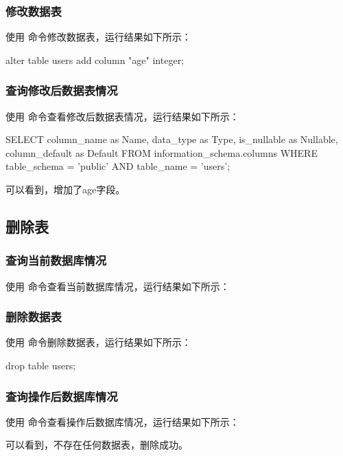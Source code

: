 \documentclass{ctexrep}
\begin{document}
\subsubsection{修改数据表}
使用  命令修改数据表，运行结果如下所示：

\begin{run}
    alter table users add column "age" integer;
\end{run}

\subsubsection{查询修改后数据表情况}
使用  命令查看修改后数据表情况，运行结果如下所示：

\begin{run}
    SELECT column_name as Name, data_type as Type, is_nullable as Nullable, column_default as Default FROM information_schema.columns WHERE table_schema = 'public' AND table_name = 'users';
\end{run}

可以看到，增加了age字段。

\subsection{删除表}
\subsubsection{查询当前数据库情况}
使用 \sql{\dt} 命令查看当前数据库情况，运行结果如下所示：

\begin{run}
    \dt
\end{run}

\subsubsection{删除数据表}
使用  命令删除数据表，运行结果如下所示：
\begin{run}
    drop table users;
\end{run}
\subsubsection{查询操作后数据库情况}
使用 \sql{\dt} 命令查看操作后数据库情况，运行结果如下所示：

\begin{run}
    \dt
\end{run}
可以看到，不存在任何数据表，删除成功。
\end{document}
